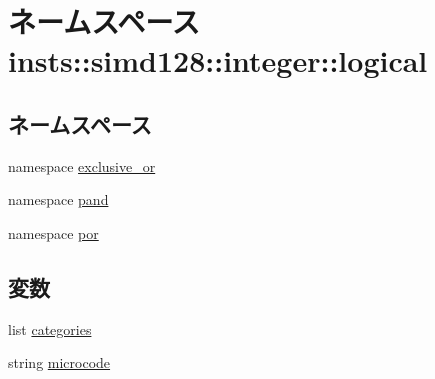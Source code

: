 \hypertarget{namespaceinsts_1_1simd128_1_1integer_1_1logical}{
\section{ネームスペース insts::simd128::integer::logical}
\label{namespaceinsts_1_1simd128_1_1integer_1_1logical}
}
\subsection*{ネームスペース}
\begin{DoxyCompactItemize}
\item 
namespace \hyperlink{namespaceinsts_1_1simd128_1_1integer_1_1logical_1_1exclusive__or}{exclusive\_\-or}
\item 
namespace \hyperlink{namespaceinsts_1_1simd128_1_1integer_1_1logical_1_1pand}{pand}
\item 
namespace \hyperlink{namespaceinsts_1_1simd128_1_1integer_1_1logical_1_1por}{por}
\end{DoxyCompactItemize}
\subsection*{変数}
\begin{DoxyCompactItemize}
\item 
list \hyperlink{namespaceinsts_1_1simd128_1_1integer_1_1logical_a273cf0f1630af14c1582f05e53354a55}{categories}
\item 
string \hyperlink{namespaceinsts_1_1simd128_1_1integer_1_1logical_a770f11a173e99389a8802f0107ed8f52}{microcode}
\end{DoxyCompactItemize}


